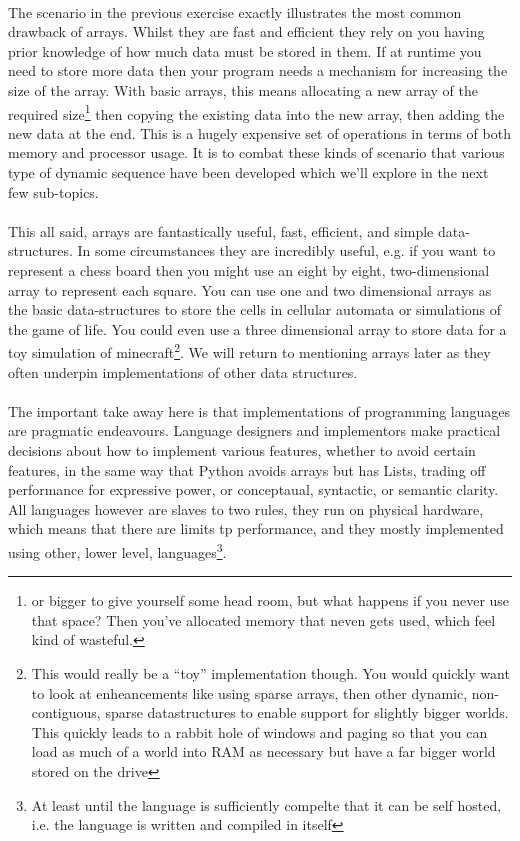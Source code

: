 \documentclass[10pt, a4paper, twosize]{article}
\begin{document}
\paragraph{} The scenario in the previous exercise exactly illustrates the most common drawback of arrays. Whilst they are fast and efficient they rely on you having prior knowledge of how much data must be stored in them. If at runtime you need to store more data then your program needs a mechanism for increasing the size of the array. With basic arrays, this means allocating a new array of the required size\footnote{or bigger to give yourself some head room, but what happens if you never use that space? Then you've allocated memory that neven gets used, which feel kind of wasteful.} then copying the existing data into the new array, then adding the new data at the end. This is a hugely expensive set of operations in terms of both memory and processor usage. It is to combat these kinds of scenario that various type of dynamic sequence have been developed which we'll explore in the next few sub-topics.

\paragraph{} This all said, arrays are fantastically useful, fast, efficient, and simple data-structures. In some circumstances they are incredibly useful, e.g. if you want to represent a chess board then you might use an eight by eight, two-dimensional array to represent each square. You can use one and two dimensional arrays as the basic data-structures to store the cells in cellular automata or simulations of the game of life. You could even use a three dimensional array to store data for a toy simulation of minecraft\footnote{This would really be a ``toy'' implementation though. You would quickly want to look at enheancements like using sparse arrays, then other dynamic, non-contiguous, sparse datastructures to enable support for slightly bigger worlds. This quickly leads to a rabbit hole of windows and paging so that you can load as much of a world into RAM as necessary but have a far bigger world stored on the drive}. We will return to mentioning arrays later as they often underpin implementations of other data structures.

\paragraph{} The important take away here is that implementations of programming languages are pragmatic endeavours. Language designers and implementors make practical decisions about how to implement various features, whether to avoid certain features, in the same way that Python avoids arrays but has Lists, trading off performance for expressive power, or conceptaual, syntactic, or semantic clarity. All languages however are slaves to two rules, they run on physical hardware, which means that there are limits tp performance, and they mostly implemented using other, lower level, languages\footnote{At least until the language is sufficiently compelte that it can be self hosted, i.e. the language is written and compiled in itself}.
\end{document}
